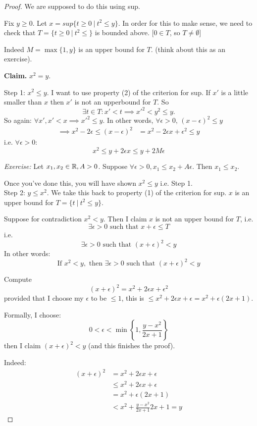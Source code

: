 \documentclass[twoside]{scrartcl}
\begin{document}
\begin{proof}
We are supposed to do this using sup. 

Fix  $y \geq 0$. Let $x = sup\{t \geq 0~|~ t^2 \leq y\}$. In order for this to make sense, we need to check that $T = \{t \geq 0~|~ t^2 \leq\}$ is bounded above. [$0 \in T$, so $T \neq \emptyset$]

Indeed $M = \max\{1,y\}$ is an upper bound for $T$. (think about this as an exercise). 

\textbf{Claim.} $x^2 =y$. 

Step 1: $x^2 \leq y$. I want to use property (2) of the criterion for sup. If $x'$ is a little smaller than $x$ then $x'$ is not an upperbound for $T$. So \[\exists t \in T: x' < t \implies x'^2 < y^2 \leq y.\] So again: $\forall x', x'< x \implies x'^2 \leq y$. In other words, $\forall \epsilon >0,\,(x-\epsilon)^2 \leq y$
\[\begin{aligned}
\implies x^2 - 2\epsilon \leq (x-\epsilon)^2 &= x^2 - 2\epsilon x + \epsilon^2 \leq y	
\end{aligned}\]
i.e. 
$\forall \epsilon >0:$
\[x^2 \leq y + 2\epsilon x \leq y + 2M\epsilon\]

\emph{Exercise:} Let $x_1,x_2 \in\mathbb{R}, A >0$. Suppose $\forall \epsilon >0, x_1\leq x_2 + A\epsilon$. Then $x_1 \leq x_2$. 

Once you've done this, you will have shown $x^2\leq y$ i.e. Step 1.\\ 

Step 2: $y \leq x^2$. We take this back to property (1) of the criterion for sup. $x$ is an upper bound for $T = \{ t ~|~ t^2 \leq y\}$. 

Suppose for contradiction $x^2 < y$. Then I claim $x$ is not an upper bound for $T$, i.e. 
\[\exists \epsilon >0 \text{ such that } x + \epsilon \leq T\]
i.e. 
\[\exists \epsilon >0 \text{ such that } (x+\epsilon)^2 <y\]
In other words:
\[\text{If } x^2 < y, \text{ then }\exists \epsilon >0 \text{ such that } (x+\epsilon)^2 < y\]

Compute
\[(x+\epsilon)^2 = x^2 + 2\epsilon x + \epsilon^2\]
provided that I choose my $\epsilon$ to be $\leq 1$, this is $\leq x^2 + 2\epsilon x + \epsilon = x^2 + \epsilon(2x + 1)$. 

Formally, I choose: 
\[0 < \epsilon < \min\left\{1,\frac{y-x^2}{2x+1}\right\}\]
then I claim $(x+\epsilon)^2 < y$ (and this finishes the proof). 

Indeed: 
\[
\begin{aligned}
  (x+\epsilon)^2 &= x^2 + 2\epsilon x + \epsilon\\
  &\leq x^2 + 2\epsilon x + \epsilon \\
  &= x^2 + \epsilon (2x + 1)\\
  &< x^2 + \frac{y-x^2}{2x+1}2x+1 = y
\end{aligned}
\]
\end{proof}
\end{document}
